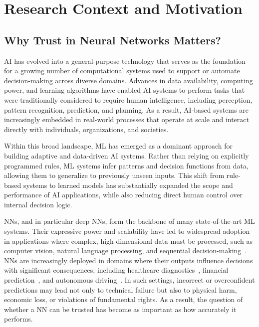 


\label{chap:intro}
\section{Research Context and Motivation}
\subsection{Why Trust in Neural Networks Matters?}
\label{sec:motivation}
\ac{AI} has evolved into a general-purpose technology that serves 
as the foundation for a growing number of computational systems used to support or automate decision-making across diverse domains. Advances in data availability, computing power, and learning algorithms have enabled \ac{AI} systems to perform tasks that were traditionally considered to require human intelligence, including perception, pattern recognition, prediction, and planning. As a result, \ac{AI}-based systems are increasingly embedded in real-world processes that operate at scale and interact directly with individuals, organizations, and societies.

Within this broad landscape, \ac{ML}  has emerged as a dominant approach for building adaptive and data-driven \ac{AI} systems. Rather than relying on explicitly programmed rules, \ac{ML}  systems infer patterns and decision functions from data, allowing them to generalize to previously unseen inputs. This shift from rule-based systems to learned models has substantially expanded the scope and performance of \ac{AI} applications, while also reducing direct human control over internal decision logic.

\acfp{NN}, and in particular deep \acp{NN}, form the backbone of many state-of-the-art \ac{ML}  systems. Their expressive power and scalability have led to widespread adoption in applications where complex, high-dimensional data must be processed, such as computer vision, natural language processing, and sequential decision-making~\cite{Goodfellow-et-al-2016}. \acp{NN} are increasingly deployed in domains where their outputs influence decisions with significant consequences, including healthcare diagnostics~\cite{Shahid2019-eq}, financial prediction~\cite{NBERw31502}, and autonomous driving~\cite{10604830}. In such settings, incorrect or overconfident predictions may lead not only to technical failure but also to physical harm, economic loss, or violations of fundamental rights. As a result, the question of whether a \ac{NN} can be trusted has become as important as how accurately it performs.

